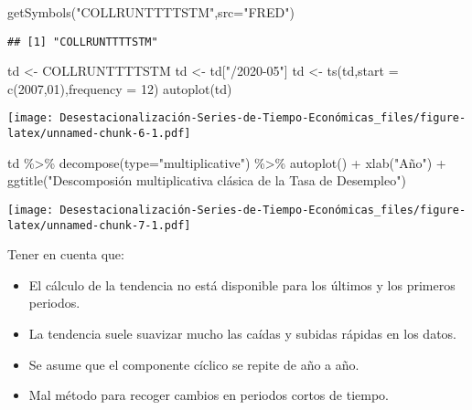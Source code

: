 \documentclass[
]{article}
\newenvironment{Shaded}{\begin{snugshade}}{\end{snugshade}}
\newcommand{\AttributeTok}[1]{\textcolor[rgb]{0.77,0.63,0.00}{#1}}
\newcommand{\DecValTok}[1]{\textcolor[rgb]{0.00,0.00,0.81}{#1}}
\newcommand{\FunctionTok}[1]{\textcolor[rgb]{0.00,0.00,0.00}{#1}}
\newcommand{\NormalTok}[1]{#1}
\newcommand{\OtherTok}[1]{\textcolor[rgb]{0.56,0.35,0.01}{#1}}
\newcommand{\SpecialCharTok}[1]{\textcolor[rgb]{0.00,0.00,0.00}{#1}}
\newcommand{\StringTok}[1]{\textcolor[rgb]{0.31,0.60,0.02}{#1}}
\providecommand{\tightlist}{%
  \setlength{\itemsep}{0pt}\setlength{\parskip}{0pt}}
\begin{document}
\begin{Shaded}
\begin{Highlighting}[]
\FunctionTok{getSymbols}\NormalTok{(}\StringTok{"COLLRUNTTTTSTM"}\NormalTok{,}\AttributeTok{src=}\StringTok{"FRED"}\NormalTok{)}
\end{Highlighting}
\end{Shaded}

\begin{verbatim}
## [1] "COLLRUNTTTTSTM"
\end{verbatim}

\begin{Shaded}
\begin{Highlighting}[]
\NormalTok{td }\OtherTok{\textless{}{-}}\NormalTok{ COLLRUNTTTTSTM}
\NormalTok{td }\OtherTok{\textless{}{-}}\NormalTok{ td[}\StringTok{"/2020{-}05"}\NormalTok{]}
\NormalTok{td }\OtherTok{\textless{}{-}} \FunctionTok{ts}\NormalTok{(td,}\AttributeTok{start =} \FunctionTok{c}\NormalTok{(}\DecValTok{2007}\NormalTok{,}\DecValTok{01}\NormalTok{),}\AttributeTok{frequency =} \DecValTok{12}\NormalTok{)}
\FunctionTok{autoplot}\NormalTok{(td)}
\end{Highlighting}
\end{Shaded}

\texttt{[image: Desestacionalización-Series-de-Tiempo-Económicas\_files/figure-latex/unnamed-chunk-6-1.pdf]}

\begin{Shaded}
\begin{Highlighting}[]
\NormalTok{td }\SpecialCharTok{\%\textgreater{}\%} \FunctionTok{decompose}\NormalTok{(}\AttributeTok{type=}\StringTok{"multiplicative"}\NormalTok{) }\SpecialCharTok{\%\textgreater{}\%}
  \FunctionTok{autoplot}\NormalTok{() }\SpecialCharTok{+} \FunctionTok{xlab}\NormalTok{(}\StringTok{"Año"}\NormalTok{) }\SpecialCharTok{+}
  \FunctionTok{ggtitle}\NormalTok{(}\StringTok{"Descomposión multiplicativa clásica de la Tasa de Desempleo"}\NormalTok{)}
\end{Highlighting}
\end{Shaded}

\texttt{[image: Desestacionalización-Series-de-Tiempo-Económicas\_files/figure-latex/unnamed-chunk-7-1.pdf]}

Tener en cuenta que:

\begin{itemize}
\tightlist
\item
  El cálculo de la tendencia no está disponible para los últimos y los
  primeros periodos.
\item
  La tendencia suele suavizar mucho las caídas y subidas rápidas en los
  datos.
\item
  Se asume que el componente cíclico se repite de año a año.
\item
  Mal método para recoger cambios en periodos cortos de tiempo.
\end{itemize}
\end{document}
